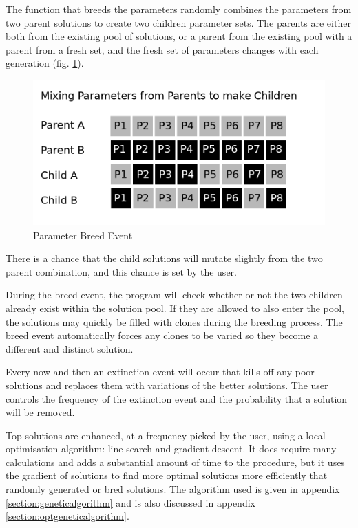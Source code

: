 The function that breeds the parameters randomly combines the parameters from two parent solutions to create two children parameter sets.  The parents are either both from the existing pool of solutions, or a parent from the existing pool with a parent from a fresh set, and the fresh set of parameters changes with each generation (fig. \ref{fig:gabreedevent}).

\begin{figure}[h]
  \begin{center}
    \includegraphics[scale=0.30]{chapters/potentials_fe_pd_ru/images/breeding.png}
    \caption{Parameter Breed Event}
    \label{fig:gabreedevent}
  \end{center}
\end{figure}

There is a chance that the child solutions will mutate slightly from the two parent combination, and this chance is set by the user.

During the breed event, the program will check whether or not the two children already exist within the solution pool.  If they are allowed to also enter the pool, the solutions may quickly be filled with clones during the breeding process.  The breed event automatically forces any clones to be varied so they become a different and distinct solution.

Every now and then an extinction event will occur that kills off any poor solutions and replaces them with variations of the better solutions.  The user controls the frequency of the extinction event and the probability that a solution will be removed.

Top solutions are enhanced, at a frequency picked by the user, using a local optimisation algorithm: line-search and gradient descent.  It does require many calculations and adds a substantial amount of time to the procedure, but it uses the gradient of solutions to find more optimal solutions more efficiently that randomly generated or bred solutions.  The algorithm used is given in appendix \ref{section:geneticalgorithm} and is also discussed in appendix \ref{section:optgeneticalgorithm}.


